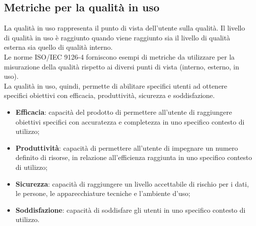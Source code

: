 \subsection{Metriche per la qualità in uso}
La qualità in uso rappresenta il punto di vista dell'utente sulla qualità. Il livello di qualità in uso è raggiunto quando viene raggiunto sia il livello di qualità esterna sia quello di qualità interno. \\
Le norme ISO/IEC 9126-4 forniscono esempi di metriche da utilizzare per la misurazione della qualità rispetto ai diversi punti di vista (interno, esterno, in uso). \\
La qualità in uso, quindi, permette di abilitare specifici utenti ad ottenere specifici obiettivi con efficacia, produttività, sicurezza e soddisfazione.
\begin{itemize}
\item \textbf{Efficacia}: capacità del prodotto di permettere all'utente di raggiungere obiettivi specifici con accuratezza e completezza in uno specifico contesto di utilizzo;
\item \textbf{Produttività}: capacità di permettere all'utente di impegnare un numero definito di risorse, in relazione all'efficienza raggiunta in uno specifico contesto di utilizzo;
\item \textbf{Sicurezza}: capacità di raggiungere un livello accettabile di rischio per i dati, le persone, le apparecchiature tecniche e l'ambiente d'uso;
\item \textbf{Soddisfazione}: capacità di soddisfare gli utenti in uno specifico contesto di utilizzo.
\end{itemize}